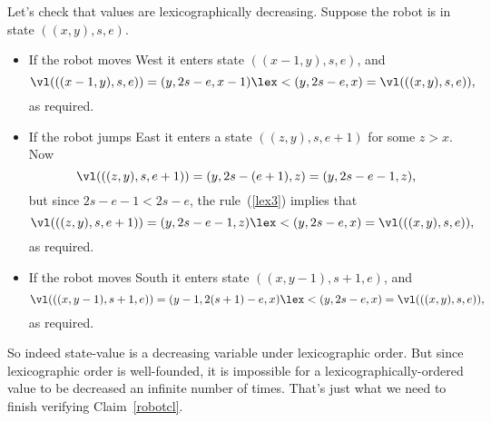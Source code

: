 Let's check that values are lexicographically decreasing.  Suppose the
robot is in state $((x,y),s,e)$.
\begin{itemize}
\item If the robot moves West it enters state $((x-1,y),s,e)$, and
\[
\vl(((x-1,y),s,e)) = (y,2s-e,x-1) \lex< (y,2s-e,x) = \vl(((x,y),s,e)),
\]
as required.


\item If the robot jumps East it enters a state $((z,y),s,e+1)$ for some
$z>x$.  Now
\[
\vl(((z,y),s,e+1)) = (y,2s-(e+1),z) = (y,2s-e-1,z),
\]
but since $2s-e-1 < 2s-e$, the rule~(\ref{lex3}) implies that
\[
\vl(((z,y),s,e+1)) = (y,2s-e-1,z)  \lex< (y,2s-e,x) = \vl(((x,y),s,e)),
\]
as required.

\item If the robot moves South it enters state $((x,y-1),s+1,e)$, and
\[
\vl(((x,y-1),s+1,e)) = (y-1,2(s+1)-e,x) \lex< (y,2s-e,x) = \vl(((x,y),s,e)),
\]
as required.

\end{itemize}

So indeed state-value is a decreasing variable under lexicographic order.
But since lexicographic order is well-founded, it is impossible for a
lexicographically-ordered value to be decreased an infinite number of
times.  That's just what we need to finish verifying Claim~\ref{robotcl}.
\fi

\begin{problems}

\practiceproblems
{}

\homeworkproblems
{}


\classproblems
{}

\examproblems
{}
\end{problems}



